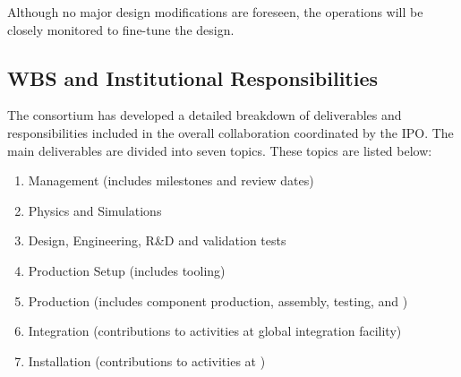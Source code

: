 Although no major design modifications are foreseen, the  operations will be closely monitored to fine-tune the \dune \dual design.

\subsection{WBS and Institutional Responsibilities}

The \dual {} consortium has developed a detailed breakdown of deliverables and responsibilities  included in the overall  collaboration  %
coordinated by the IPO. The main deliverables are %
divided into seven topics. These topics are listed below:

\begin{enumerate}
\item Management \dual {} (includes milestones and review dates)
\item Physics and Simulations
\item Design, Engineering, R\&D and validation tests
\item Production Setup (includes tooling)
\item Production (includes component production, assembly, testing, and )
\item Integration (contributions to activities at global integration facility)
\item Installation (contributions to activities at \surf)

\end{enumerate}

